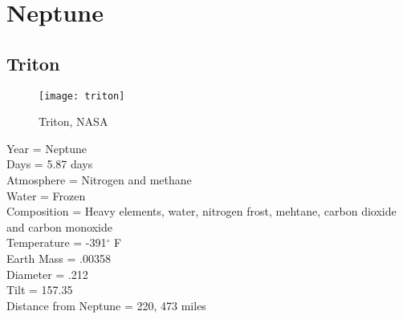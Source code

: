\documentclass[12pt]{book}
\begin{document}
\section{Neptune}
\subsection{Triton}
 \begin{wrapfigure}{R}{0.4\textwidth}
         \vspace{-1cm}
        \begin{center}
        \texttt{[image: triton]}\caption{\scriptsize Triton, NASA}
        \end{center}
         \vspace{-1cm}
    \end{wrapfigure}
Year = Neptune\\
Days = 5.87 days\\
Atmosphere = Nitrogen and methane\\
Water = Frozen\\
Composition = Heavy elements, water, nitrogen frost, mehtane, carbon dioxide and carbon monoxide\\
Temperature = -391$^{\circ}$ F\\
Earth Mass = .00358\\
Diameter = .212\\ 
Tilt = 157.35\\
Distance from Neptune = 220, 473 miles\\
\end{document}
